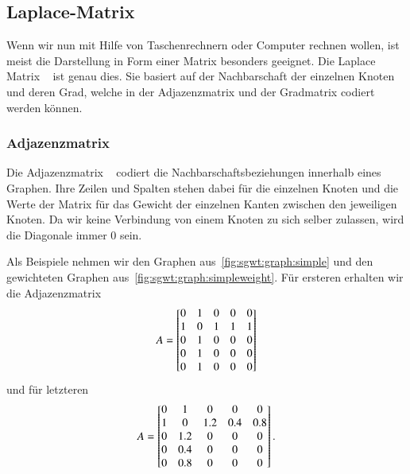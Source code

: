 \subsection{Laplace-Matrix\label{subsec:sgwt:laplacem}}

Wenn wir nun mit Hilfe von Taschenrechnern oder Computer rechnen wollen, ist 
meist die Darstellung in Form einer Matrix besonders geeignet. Die Laplace 
Matrix \laplaceL{}~\cite{noauthor_laplace-matrix_2017} ist genau 
dies. Sie basiert auf der Nachbarschaft der einzelnen Knoten und deren Grad, 
welche in der Adjazenzmatrix und der Gradmatrix codiert werden k\"onnen.

\subsubsection{Adjazenzmatrix \texorpdfstring{\adjacencyM{}}{A}}

Die Adjazenzmatrix \adjacencyM{}~\cite{noauthor_adjacency_2019} codiert die 
Nachbarschaftsbeziehungen innerhalb eines Graphen. Ihre Zeilen und Spalten 
stehen dabei f\"ur die einzelnen Knoten und die Werte der Matrix f\"ur das 
Gewicht der einzelnen Kanten zwischen den jeweiligen Knoten. Da wir keine 
Verbindung von einem Knoten zu sich selber zulassen, wird die Diagonale immer 
$0$ sein. 

Als Beispiele nehmen wir den Graphen aus~\cref{fig:sgwt:graph:simple} und den 
gewichteten Graphen aus~\cref{fig:sgwt:graph:simpleweight}. F\"ur ersteren 
erhalten wir die Adjazenzmatrix
\begin{equation*}
\adjacencyM =
\begin{bmatrix}
0 & 1 & 0 & 0 & 0 \\
1 & 0 & 1 & 1 & 1 \\
0 & 1 & 0 & 0 & 0 \\
0 & 1 & 0 & 0 & 0 \\
0 & 1 & 0 & 0 & 0
\end{bmatrix}
\end{equation*}
und f\"ur letzteren
\begin{equation*}
\adjacencyM =
\begin{bmatrix}
0 & 1 & 0 & 0 & 0 \\
1 & 0 & 1.2 & 0.4 & 0.8 \\
0 & 1.2 & 0 & 0 & 0 \\
0 & 0.4 & 0 & 0 & 0 \\
0 & 0.8 & 0 & 0 & 0
\end{bmatrix}.
\end{equation*}

